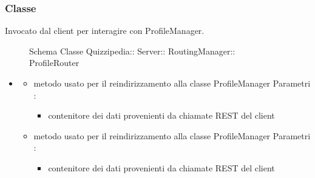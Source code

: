 \subsubsection{Classe }
Invocato dal client per interagire con ProfileManager.
\begin{figure}[H]
\centering
\noindent{}
\caption[Schema Classe ProfileRouter]{Schema Classe Quizzipedia:: Server:: RoutingManager:: ProfileRouter}
\end{figure}
\begin{itemize}
\item {}
\begin{itemize}
\item {}
\newline
metodo usato per il reindirizzamento alla classe ProfileManager
\newline
Parametri :
\begin{itemize}
\item {}
\newline
contenitore dei dati provenienti da chiamate REST del client
\end{itemize}
\item {}
\newline
metodo usato per il reindirizzamento alla classe ProfileManager
\newline
Parametri :
\begin{itemize}
\item {}
\newline
contenitore dei dati provenienti da chiamate REST del client
\end{itemize}
\end{itemize}
\end{itemize}
